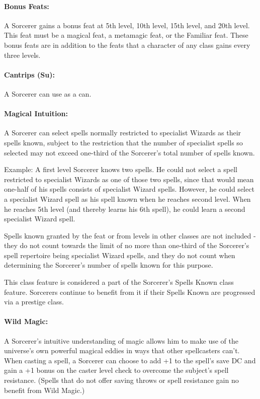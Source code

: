 \paragraph{Bonus Feats:} 
A Sorcerer gains a bonus feat at 5th level, 10th level, 15th level, and 20th level. 
This feat must be a magical feat, a metamagic feat, or the Familiar feat.
These bonus feats are in addition to the feats that a character of any class gains every three levels. 

\paragraph[Cantrips]{Cantrips (Su):} 
A Sorcerer can use  as a  can.

\paragraph{Magical Intuition:} 
A Sorcerer can select spells normally restricted to specialist Wizards as their spells known,
subject to the restriction that the number of specialist spells so selected may not exceed one-third of the Sorcerer's total number of spells known.

Example: A first level Sorcerer knows two spells. He could not select a spell restricted to specialist Wizards as one of those
two spells, since that would mean one-half of his spells consists of specialist Wizard spells.
However, he could select a specialist Wizard spell as his spell known when he reaches second level.
When he reaches 5th level (and thereby learns his 6th spell), he could learn a second specialist Wizard spell.

Spells known granted by the  feat or from levels in other classes are not included - 
they do not count towards the limit of no more than one-third of the Sorcerer's spell repertoire being specialist Wizard spells,
and they do not count when determining the Sorcerer's number of spells known for this purpose.

This class feature is considered a part of the Sorcerer's Spells Known class feature. Sorcerers continue to benefit from it if their Spells Known are progressed via a prestige class.

\paragraph{Wild Magic:} A Sorcerer's intuitive understanding of magic allows him to make use of the universe's
own powerful magical eddies in ways that other spellcasters can't.
When casting a spell, a Sorcerer can choose to add +1 to the spell's save DC 
and gain a +1 bonus on the caster level check to overcome the subject's spell resistance.
(Spells that do not offer saving throws or spell resistance gain no benefit from Wild Magic.)

